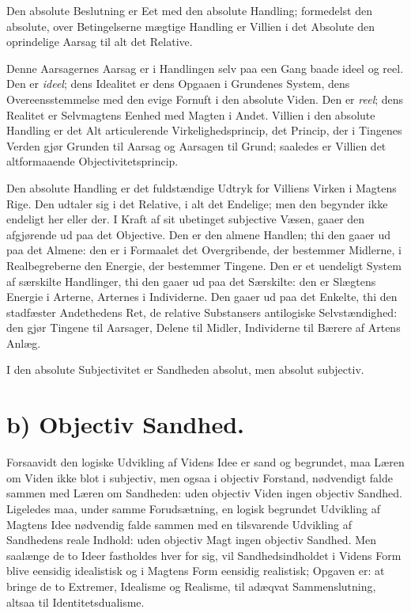 \documentclass[12pt]{book}
\newcommand{\opage}[1]{\marginnote{\footnotesize\textit{[#1]}}}
\begin{document}
Den absolute Beslutning er Eet med den absolute Handling; formedelst
den absolute, over Betingelserne mægtige Handling er Villien i det
Absolute den oprindelige Aarsag til alt det Relative.

Denne Aarsagernes Aarsag er i Handlingen selv paa een Gang baade
ideel og reel. Den er \emph{ideel}; dens Idealitet er dens Opgaaen i
Grundenes System, dens Overeensstemmelse med den evige Fornuft i den
absolute Viden. Den er \emph{reel}; dens Realitet er Selvmagtens
Eenhed med Magten i Andet. Villien i den absolute Handling er det
Alt articulerende Virkelighedsprincip, det Princip, der i Tingenes
Verden gjør Grunden til Aarsag og Aarsagen til
\opage{62} Grund; saaledes er Villien det altformaaende Objectivitetsprincip.

Den absolute Handling er det fuldstændige Udtryk for Villiens Virken
i Magtens Rige. Den udtaler sig i det Relative, i alt det Endelige;
men den begynder ikke endeligt her eller der. I Kraft af sit
ubetinget subjective Væsen, gaaer den afgjørende ud paa det
Objective. Den er den almene Handlen; thi den gaaer ud paa det
Almene: den er i Formaalet det Overgribende, der bestemmer Midlerne,
i Realbegreberne den Energie, der bestemmer Tingene. Den er et
uendeligt System af særskilte Handlinger, thi den gaaer ud paa det
Særskilte: den er Slægtens Energie i Arterne, Arternes i
Individerne. Den gaaer ud paa det Enkelte, thi den stadfæster
Andethedens Ret, de relative Substansers antilogiske Selvstændighed:
den gjør Tingene til Aarsager, Delene til Midler, Individerne til
Bærere af Artens Anlæg.

I den absolute Subjectivitet er Sandheden absolut, men absolut
subjectiv.

\section*{b) Objectiv Sandhed.}

Forsaavidt den logiske Udvikling af Videns Idee er sand og
begrundet, maa Læren om Viden ikke blot i subjectiv, men ogsaa i
objectiv Forstand, nødvendigt falde sammen med Læren om Sandheden:
uden objectiv Viden ingen objectiv Sandhed. Ligeledes maa, under
samme Forudsætning, en logisk begrundet Udvikling af Magtens Idee
nødvendig falde sammen med en tilsvarende Udvikling af Sandhedens
reale Indhold: uden objectiv Magt ingen objectiv Sandhed. Men
saalænge de to Ideer fastholdes hver for sig, vil Sandhedsindholdet
i Videns Form blive eensidig idealistisk og i Magtens Form eensidig
realistisk; Opgaven er: at bringe de to Extremer, Idealisme og
Realisme, til adæqvat Sammenslutning, altsaa til Identitetsdualisme.
\end{document}
